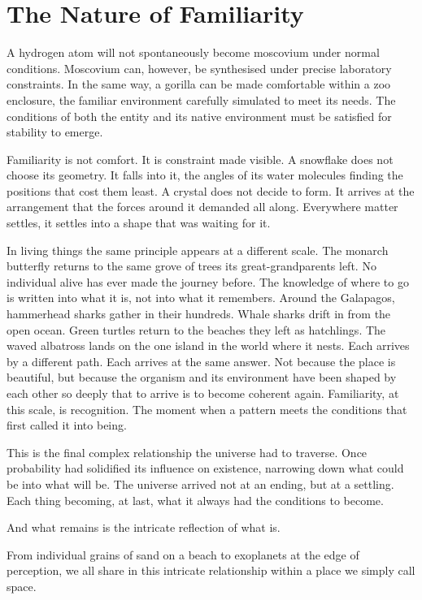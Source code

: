 \documentclass[12pt]{article}
\begin{document}
\section{The Nature of Familiarity}

A hydrogen atom will not spontaneously become moscovium under normal conditions.
Moscovium can, however, be synthesised under precise laboratory constraints. In
the same way, a gorilla can be made comfortable within a zoo enclosure, the
familiar environment carefully simulated to meet its needs. The conditions of
both the entity and its native environment must be satisfied for stability to
emerge.

Familiarity is not comfort. It is constraint made visible. A snowflake does not
choose its geometry. It falls into it, the angles of its water molecules finding
the positions that cost them least. A crystal does not decide to form. It arrives
at the arrangement that the forces around it demanded all along. Everywhere matter
settles, it settles into a shape that was waiting for it.

In living things the same principle appears at a different scale. The monarch
butterfly returns to the same grove of trees its great-grandparents left. No
individual alive has ever made the journey before. The knowledge of where to go
is written into what it is, not into what it remembers. Around the Galapagos, hammerhead sharks gather in their hundreds. Whale sharks
drift in from the open ocean. Green turtles return to the beaches they left as
hatchlings. The waved albatross lands on the one island in the world where it
nests. Each arrives by a different path. Each arrives at the same answer. Not
because the place is beautiful, but because the organism and its environment have
been shaped by each other so deeply that to arrive is to become coherent again.
Familiarity, at this scale, is recognition. The moment when a pattern meets the
conditions that first called it into being.

This is the final complex relationship the universe had to traverse. Once
probability had solidified its influence on existence, narrowing down what
could be into what will be. The universe arrived not at an ending, but at a
settling. Each thing becoming, at last, what it always had the conditions to
become.

And what remains is the intricate reflection of what is.

From individual grains of sand on a beach to exoplanets at the edge of
perception, we all share in this intricate relationship within a place we simply
call space.
\end{document}
